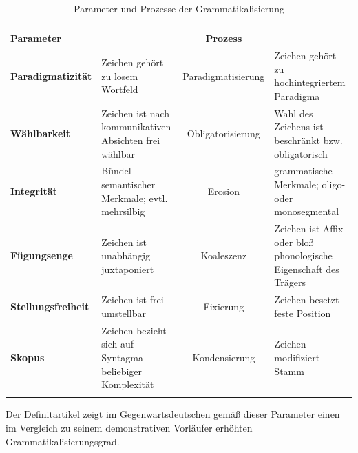 %
\begin{table}
\centering
\small
\begin{tabular}{
	l
	>{\raggedright}p{}
	c
	>{\raggedright\arraybackslash}p{}
}
\lsptoprule
& \multicolumn{3}{c}{\textbf{Grammatikalisierungsgrad}}\\
                   & \multicolumn{1}{c}{\textbf{niedrig}}& & \multicolumn{1}{c}{\textbf{hoch}}\\
\cmidrule(lr){2-4}
\textbf{Parameter} & & \textbf{Prozess}   &                   \\ \midrule
\textbf{Paradigmatizität}            & Zeichen gehört zu losem Wortfeld                         & Paradigmatisierung & Zeichen gehört zu hochintegriertem Paradigma                     \\
\textbf{Wählbarkeit}                 & Zeichen ist nach kommunikativen Absichten frei wählbar   & Obligatorisierung  & Wahl des Zeichens ist beschränkt bzw. obligatorisch              \\
\textbf{Integrität}                  & Bündel semantischer Merkmale; evtl. mehrsilbig           & Erosion            & grammatische Merkmale; oligo- oder monosegmental                 \\
\textbf{Fügungsenge}                 & Zeichen ist unabhängig juxtaponiert                      & Koaleszenz         & Zeichen ist Affix oder bloß phonologische Eigenschaft des Trägers \\
\textbf{Stellungsfreiheit}           & Zeichen ist frei umstellbar                              & Fixierung          & Zeichen besetzt feste Position                                   \\
\textbf{Skopus}                      & Zeichen bezieht sich auf Syntagma beliebiger Komplexität & Kondensierung      & Zeichen modifiziert Stamm                                        \\ \lspbottomrule
\end{tabular}
\caption{Parameter und Prozesse der Grammatikalisierung \parencite[1255]{Lehmann1995}}
\label{tab:lehmann-parameter-prozess}
\end{table}

 
Der Definitartikel zeigt im Gegenwartsdeutschen gemäß dieser Parameter einen im Vergleich zu seinem demonstrativen Vorläufer erhöhten Grammatikalisierungsgrad. 

